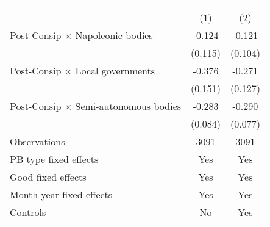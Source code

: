 \begin{tabular}{l*{2}{c}}
\hline\hline
                    &\multicolumn{2}{c}{ }    \\
                    &\multicolumn{1}{c}{(1)}&\multicolumn{1}{c}{(2)}\\
\hline
Post-Consip $\times$ Napoleonic bodies&      -0.124&      -0.121\\
                    &     (0.115)&     (0.104)\\
[1em]
Post-Consip $\times$ Local governments&      -0.376&      -0.271\\
                    &     (0.151)&     (0.127)\\
[1em]
Post-Consip $\times$ Semi-autonomous bodies&      -0.283&      -0.290\\
                    &     (0.084)&     (0.077)\\
\hline
Observations        &        3091&        3091\\
PB type fixed effects&         Yes&         Yes\\
Good fixed effects  &         Yes&         Yes\\
Month-year fixed effects&         Yes&         Yes\\
Controls            &          No&         Yes\\
\hline\hline
\end{tabular}
